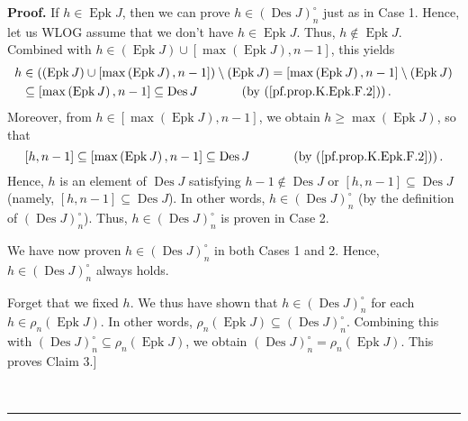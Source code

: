 \documentclass[numbers=enddot,12pt,final,onecolumn,notitlepage]{scrartcl}%
\theoremstyle{definition}
\newenvironment{proof}[1][Proof]{\noindent\textbf{#1.} }{\ \rule{0.5em}{0.5em}}
\newenvironment{verlong}{}{}
\begin{document}
\begin{verlong}
\begin{proof}
If $h\in\operatorname*{Epk}J$, then we can prove $h\in\left(
\operatorname*{Des}J\right)  _{n}^{\circ}$ just as in Case 1. Hence, let us
WLOG assume that we don't have $h\in\operatorname*{Epk}J$. Thus,
$h\notin\operatorname*{Epk}J$. Combined with $h\in\left(  \operatorname*{Epk}%
J\right)  \cup\left[  \max\left(  \operatorname*{Epk}J\right)  ,n-1\right]  $,
this yields%
\begin{align*}
h  &  \in\left(  \left(  \operatorname*{Epk}J\right)  \cup\left[  \max\left(
\operatorname*{Epk}J\right)  ,n-1\right]  \right)  \setminus\left(
\operatorname*{Epk}J\right)  =\left[  \max\left(  \operatorname*{Epk}J\right)
,n-1\right]  \setminus\left(  \operatorname*{Epk}J\right) \\
&  \subseteq\left[  \max\left(  \operatorname*{Epk}J\right)  ,n-1\right]
\subseteq\operatorname*{Des}J\ \ \ \ \ \ \ \ \ \ \left(  \text{by
(\ref{pf.prop.K.Epk.F.2})}\right)  .
\end{align*}
Moreover, from $h\in\left[  \max\left(  \operatorname*{Epk}J\right)
,n-1\right]  $, we obtain $h\geq\max\left(  \operatorname*{Epk}J\right)  $, so
that%
\[
\left[  h,n-1\right]  \subseteq\left[  \max\left(  \operatorname*{Epk}%
J\right)  ,n-1\right]  \subseteq\operatorname*{Des}%
J\ \ \ \ \ \ \ \ \ \ \left(  \text{by (\ref{pf.prop.K.Epk.F.2})}\right)  .
\]
Hence, $h$ is an element of $\operatorname*{Des}J$ satisfying $h-1\notin%
\operatorname*{Des}J$ or $\left[  h,n-1\right]  \subseteq\operatorname*{Des}J$
(namely, $\left[  h,n-1\right]  \subseteq\operatorname*{Des}J$). In other
words, $h\in\left(  \operatorname*{Des}J\right)  _{n}^{\circ}$ (by the
definition of $\left(  \operatorname*{Des}J\right)  _{n}^{\circ}$). Thus,
$h\in\left(  \operatorname*{Des}J\right)  _{n}^{\circ}$ is proven in Case 2.

We have now proven $h\in\left(  \operatorname*{Des}J\right)  _{n}^{\circ}$ in
both Cases 1 and 2. Hence, $h\in\left(  \operatorname*{Des}J\right)
_{n}^{\circ}$ always holds.

Forget that we fixed $h$. We thus have shown that $h\in\left(
\operatorname*{Des}J\right)  _{n}^{\circ}$ for each $h\in\rho_{n}\left(
\operatorname*{Epk}J\right)  $. In other words, $\rho_{n}\left(
\operatorname*{Epk}J\right)  \subseteq\left(  \operatorname*{Des}J\right)
_{n}^{\circ}$. Combining this with $\left(  \operatorname*{Des}J\right)
_{n}^{\circ}\subseteq\rho_{n}\left(  \operatorname*{Epk}J\right)  $, we obtain
$\left(  \operatorname*{Des}J\right)  _{n}^{\circ}=\rho_{n}\left(
\operatorname*{Epk}J\right)  $. This proves Claim 3.]


\end{proof}
\end{verlong}
\end{document}
